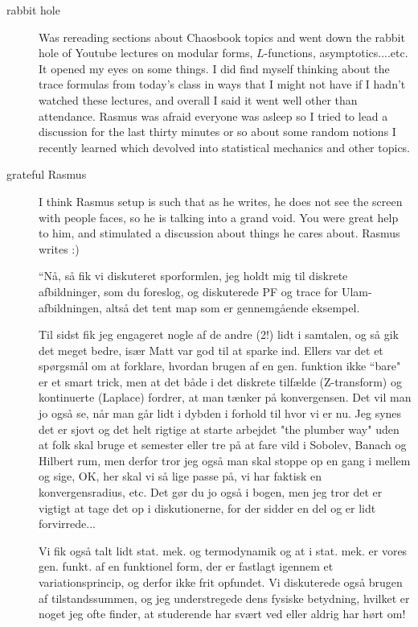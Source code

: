\begin{description}
{\begin{description}
\item[rabbit hole]
Was rereading sections about Chaosbook topics and went down the rabbit
hole of Youtube lectures on modular forms, $L$-functions,
asymptotics....etc. It opened my eyes on some things.
I did find myself thinking about the trace
formulas from today's class in ways that I might not have if I hadn't
watched these lectures, and overall I said it went well other than
attendance. Rasmus was afraid everyone was asleep so I tried to lead a
discussion for the last thirty minutes or so about some random notions I
recently learned which devolved into statistical mechanics and other
topics.

\item[grateful Rasmus] I think Rasmus setup is such that as he writes, he
does not see the screen with people faces, so he is talking into a grand
void. You were great help to him, and stimulated a discussion about
things he cares about. Rasmus writes :)

``N{\aa}, s{\aa} fik vi diskuteret sporformlen, jeg holdt mig til diskrete
afbildninger, som du foreslog, og diskuterede PF og trace for
Ulam-afbildningen, alts{\aa} det tent map som er gennemg{\aa}ende eksempel.

Til sidst fik jeg engageret nogle af de andre (2!) lidt i samtalen, og s{\aa}
gik det meget bedre, is{\ae}r Matt var god til at sparke ind. Ellers var
det et sp{\o}rgsm{\aa}l om at forklare, hvordan brugen af en gen. funktion ikke
``bare" er et smart trick, men at det b{\aa}de i det diskrete tilf{\ae}lde
(Z-transform) og kontinuerte (Laplace) fordrer, at man t{\ae}nker p{\aa}
konvergensen. Det vil man jo ogs{\aa} se, n{\aa}r man g{\aa}r lidt i dybden i forhold
til hvor vi er nu. Jeg synes det er sjovt og det helt rigtige at starte
arbejdet "the plumber way" uden at folk skal bruge et semester eller tre
p{\aa} at fare vild i Sobolev, Banach og Hilbert rum, men derfor tror jeg
ogs{\aa} man skal stoppe op en gang i mellem og sige, OK, her skal vi s{\aa} lige
passe p{\aa}, vi har faktisk en konvergensradius, etc. Det g{\o}r du jo ogs{\aa} i
bogen, men jeg tror det er vigtigt at tage det op i diskutionerne, for
der sidder en del og er lidt forvirrede...

Vi fik ogs{\aa} talt lidt stat. mek. og termodynamik og at i stat. mek. er
vores gen. funkt. af en funktionel form, der er fastlagt igennem et
variationsprincip, og derfor ikke frit opfundet. Vi diskuterede ogs{\aa}
brugen af tilstandssummen, og jeg understregede dens fysiske betydning,
hvilket er noget jeg ofte finder, at studerende har sv{\ae}rt ved eller
aldrig har h{\o}rt om!


\end{description}}
\end{description}
